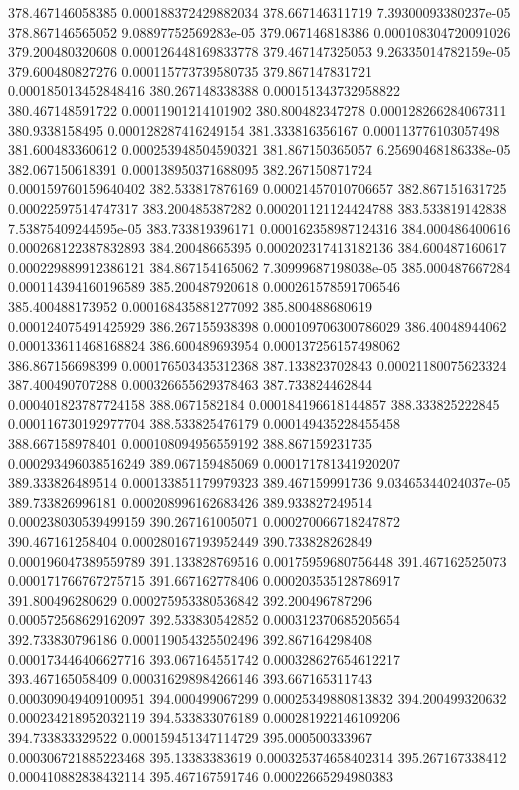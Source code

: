 {378.467146058385 0.000188372429882034
378.667146311719 7.39300093380237e-05
378.867146565052 9.08897752569283e-05
379.067146818386 0.000108304720091026
379.200480320608 0.000126448169833778
379.467147325053 9.26335014782159e-05
379.600480827276 0.000115773739580735
379.867147831721 0.000185013452848416
380.267148338388 0.000151343732958822
380.467148591722 0.00011901214101902
380.800482347278 0.000128266284067311
380.9338158495 0.000128287416249154
381.333816356167 0.000113776103057498
381.600483360612 0.000253948504590321
381.867150365057 6.25690468186338e-05
382.067150618391 0.000138950371688095
382.267150871724 0.000159760159640402
382.533817876169 0.00021457010706657
382.867151631725 0.00022597514747317
383.200485387282 0.000201121124424788
383.533819142838 7.53875409244595e-05
383.733819396171 0.000162358987124316
384.000486400616 0.000268122387832893
384.20048665395 0.000202317413182136
384.600487160617 0.000229889912386121
384.867154165062 7.30999687198038e-05
385.000487667284 0.000114394160196589
385.200487920618 0.000261578591706546
385.400488173952 0.000168435881277092
385.800488680619 0.000124075491425929
386.267155938398 0.000109706300786029
386.40048944062 0.000133611468168824
386.600489693954 0.000137256157498062
386.867156698399 0.000176503435312368
387.133823702843 0.00021180075623324
387.400490707288 0.000326655629378463
387.733824462844 0.000401823787724158
388.0671582184 0.000184196618144857
388.333825222845 0.000116730192977704
388.533825476179 0.000149435228455458
388.667158978401 0.000108094956559192
388.867159231735 0.000293496038516249
389.067159485069 0.000171781341920207
389.333826489514 0.000133851179979323
389.467159991736 9.03465344024037e-05
389.733826996181 0.000208996162683426
389.933827249514 0.000238030539499159
390.267161005071 0.000270066718247872
390.467161258404 0.000280167193952449
390.733828262849 0.000196047389559789
391.133828769516 0.00175959680756448
391.467162525073 0.000171766767275715
391.667162778406 0.000203535128786917
391.800496280629 0.000275953380536842
392.200496787296 0.000572568629162097
392.533830542852 0.000312370685205654
392.733830796186 0.000119054325502496
392.867164298408 0.000173446406627716
393.067164551742 0.000328627654612217
393.467165058409 0.000316298984266146
393.667165311743 0.000309049409100951
394.000499067299 0.00025349880813832
394.200499320632 0.000234218952032119
394.533833076189 0.000281922146109206
394.733833329522 0.000159451347114729
395.000500333967 0.000306721885223468
395.13383383619 0.000325374658402314
395.267167338412 0.000410882838432114
395.467167591746 0.00022665294980383
}
